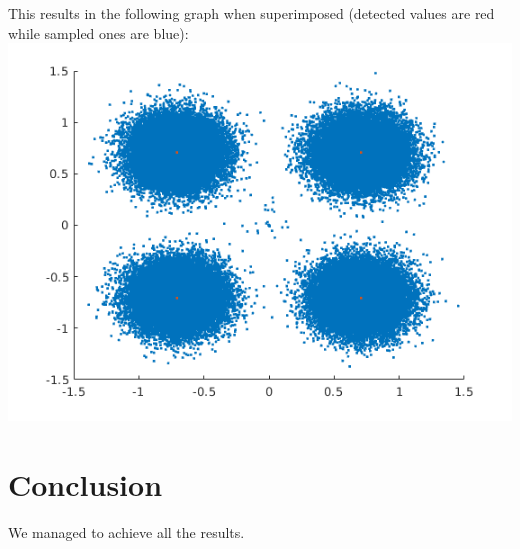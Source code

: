 \documentclass[conference,9pt]{IEEEtran}
\begin{document}
This results in the following graph when superimposed (detected values are red while sampled ones are blue):
\includegraphics[scale=0.6]{plot-2v}

\section{Conclusion}
We managed to achieve all the results.

\end{document}
